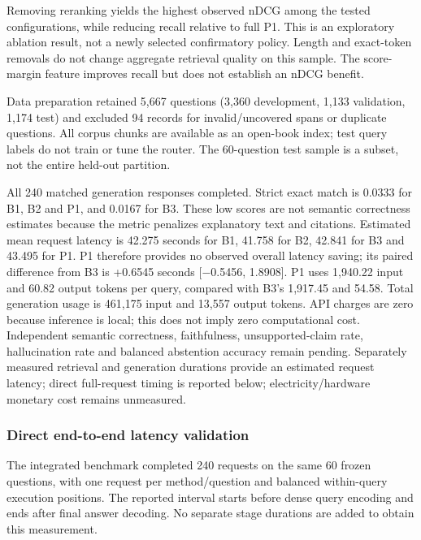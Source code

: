 Removing reranking yields the highest observed nDCG among the tested
configurations, while reducing recall relative to full P1. This is an
exploratory ablation result, not a newly selected confirmatory policy.
Length and exact-token removals do not change aggregate retrieval
quality on this sample. The score-margin feature improves recall but
does not establish an nDCG benefit.

Data preparation retained 5,667 questions (3,360 development, 1,133
validation, 1,174 test) and excluded 94 records for invalid/uncovered
spans or duplicate questions. All corpus chunks are available as an
open-book index; test query labels do not train or tune the router. The
60-question test sample is a subset, not the entire held-out partition.

All 240 matched generation responses completed. Strict exact match is
0.0333 for B1, B2 and P1, and 0.0167 for B3. These low scores are not
semantic correctness estimates because the metric penalizes explanatory
text and citations. Estimated mean request latency is 42.275 seconds for
B1, 41.758 for B2, 42.841 for B3 and 43.495 for P1. P1 therefore
provides no observed overall latency saving; its paired difference from
B3 is +0.6545 seconds {[}−0.5456, 1.8908{]}. P1 uses 1,940.22 input and
60.82 output tokens per query, compared with B3's 1,917.45 and 54.58.
Total generation usage is 461,175 input and 13,557 output tokens. API
charges are zero because inference is local; this does not imply zero
computational cost. Independent semantic correctness, faithfulness,
unsupported-claim rate, hallucination rate and balanced abstention
accuracy remain pending. Separately measured retrieval and generation
durations provide an estimated request latency; direct full-request
timing is reported below; electricity/hardware monetary cost remains
unmeasured.

\hypertarget{direct-end-to-end-latency-validation}{%
\subsubsection{Direct end-to-end latency
validation}\label{direct-end-to-end-latency-validation}}

The integrated benchmark completed 240 requests on the same 60 frozen
questions, with one request per method/question and balanced
within-query execution positions. The reported interval starts before
dense query encoding and ends after final answer decoding. No separate
stage durations are added to obtain this measurement.

